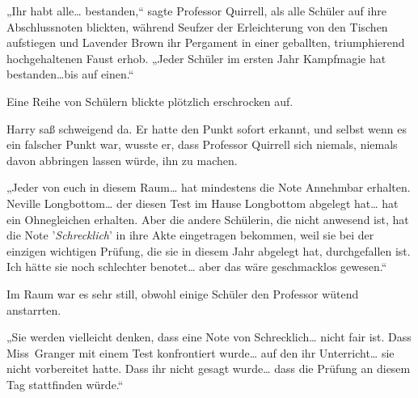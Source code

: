 „Ihr habt alle… bestanden,“ sagte Professor Quirrell, als alle Schüler auf ihre Abschlussnoten blickten, während Seufzer der Erleichterung von den Tischen aufstiegen und Lavender Brown ihr Pergament in einer geballten, triumphierend hochgehaltenen Faust erhob.
„Jeder Schüler im ersten Jahr Kampfmagie hat bestanden…bis auf einen.“

Eine Reihe von Schülern blickte plötzlich erschrocken auf.

Harry saß schweigend da. Er hatte den Punkt sofort erkannt, und selbst wenn es ein falscher Punkt war, wusste er, dass Professor Quirrell sich niemals, niemals davon abbringen lassen würde, ihn zu machen.

„Jeder von euch in diesem Raum… hat mindestens die Note Annehmbar erhalten. Neville Longbottom… der diesen Test im Hause Longbottom abgelegt hat… hat ein Ohnegleichen erhalten. Aber die andere Schülerin, die nicht anwesend ist, hat die Note '\emph{Schrecklich}' in ihre Akte eingetragen bekommen, weil sie bei der einzigen wichtigen Prüfung, die sie in diesem Jahr abgelegt hat, durchgefallen ist. Ich hätte sie noch schlechter benotet… aber das wäre geschmacklos gewesen.“

Im Raum war es sehr still, obwohl einige Schüler den Professor wütend anstarrten.

„Sie werden vielleicht denken, dass eine Note von Schrecklich… nicht fair ist. Dass Miss~Granger mit einem Test konfrontiert wurde… auf den ihr Unterricht… sie nicht vorbereitet hatte. Dass ihr nicht gesagt wurde… dass die Prüfung an diesem Tag stattfinden würde.“

